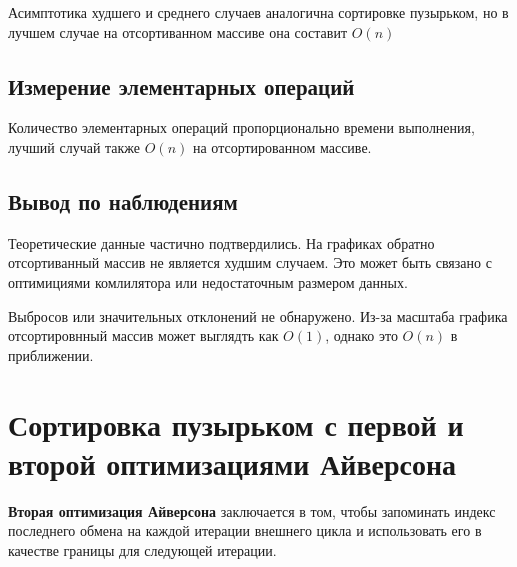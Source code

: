 \documentclass[11pt]{article}
\begin{document}
\begin{center}
\end{center}
{ \hspace*{\fill} }

Асимптотика худшего и среднего случаев аналогична сортировке пузырьком, но в лучшем случае
на отсортиванном массиве она составит $O(n)$

\subsection{Измерение элементарных операций}

\begin{center}
\end{center}
{ \hspace*{\fill} }

\begin{center}
\end{center}
{ \hspace*{\fill} }

Количество элементарных операций пропорционально времени выполнения, лучший случай также
$O(n)$ на отсортированном массиве.

\subsection{Вывод по наблюдениям}

Теоретические данные частично подтвердились. На графиках обратно отсортиванный массив не является
худшим случаем. Это может быть связано с оптимициями комлилятора или недостаточным размером данных.

Выбросов или значительных отклонений не обнаружено.
Из-за масштаба графика отсортировнный массив может выглядть как $O(1)$, однако это $O(n)$
в приближении.

\newpage

\setcounter{section}{4}
\section*{\centering Сортировка пузырьком с первой и второй оптимизациями Айверсона}

\textbf{Вторая оптимизация Айверсона} заключается в том, чтобы запоминать индекс последнего обмена
на каждой итерации внешнего цикла и использовать его в качестве границы для следующей итерации.
\end{document}
